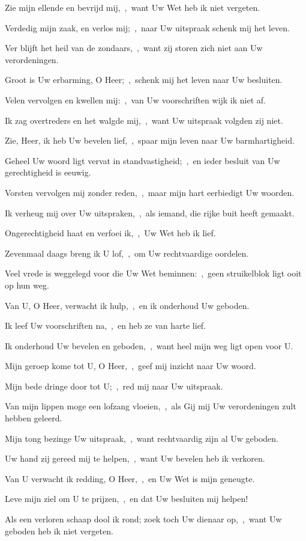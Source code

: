 \documentclass[12pt,twoside,a5paper]{article}
\begin{document}
\begin{halfparskip}
   Zie mijn ellende en bevrijd mij,~\sep\ want Uw Wet heb ik niet vergeten.

  Verdedig mijn zaak, en verlos mij;~\sep\ naar Uw uitspraak schenk mij het leven.

  Ver blijft het heil van de zondaars,~\sep\ want zij storen zich niet aan Uw verordeningen.

  Groot is Uw erbarming, O Heer;~\sep\ schenk mij het leven naar Uw besluiten.

  Velen vervolgen en kwellen mij:~\sep\ van Uw voorschriften wijk ik niet af.

  Ik zag overtreders en het walgde mij,~\sep\ want Uw uitspraak volgden zij niet.

  Zie, Heer, ik heb Uw bevelen lief,~\sep\ spaar mijn leven naar Uw barmhartigheid.

  Geheel Uw woord ligt vervat in standvastigheid;~\sep\ en ieder besluit van Uw gerechtigheid is eeuwig.
\end{halfparskip}

\begin{halfparskip}
   Vorsten vervolgen mij zonder reden,~\sep\ maar mijn hart eerbiedigt Uw woorden.

  Ik verheug mij over Uw uitspraken,~\sep\ als iemand, die rijke buit heeft gemaakt.

  Ongerechtigheid haat en verfoei ik,~\sep\ Uw Wet heb ik lief.

  Zevenmaal daags breng ik U lof,~\sep\ om Uw rechtvaardige oordelen.

  Veel vrede is weggelegd voor die Uw Wet beminnen:~\sep\ geen struikelblok ligt ooit op hun weg.

  Van U, O Heer, verwacht ik hulp,~\sep\ en ik onderhoud Uw geboden.

  Ik leef Uw voorschriften na,~\sep\ en heb ze van harte lief.

  Ik onderhoud Uw bevelen en geboden,~\sep\ want heel mijn weg ligt open voor U.
\end{halfparskip}

\begin{halfparskip}
   Mijn geroep kome tot U, O Heer,~\sep\ geef mij inzicht naar Uw woord.

  Mijn bede dringe door tot U;~\sep\ red mij naar Uw uitspraak.

  Van mijn lippen moge een lofzang vloeien,~\sep\ als Gij mij Uw verordeningen  zult hebben geleerd.

  Mijn tong bezinge Uw uitspraak,~\sep\ want rechtvaardig zijn al Uw geboden.

  Uw hand zij gereed mij te helpen,~\sep\ want Uw bevelen heb ik verkoren.

  Van U verwacht ik redding, O Heer,~\sep\ en Uw Wet is mijn geneugte.

  Leve mijn ziel om U te prijzen,~\sep\ en dat Uw besluiten mij helpen!

  Als een verloren schaap dool ik rond; zoek toch Uw dienaar op,~\sep\ want Uw geboden heb ik niet vergeten.
\end{halfparskip}
\end{document}
